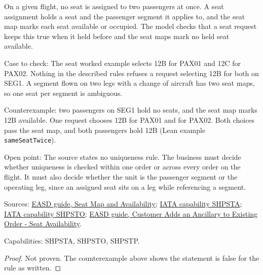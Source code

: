 \begin{theorem}
  \label{thm:ancillaries-seat-one-passenger}
  On a given flight, no seat is assigned to two passengers at once. A seat
  assignment holds a seat and the passenger segment it applies to, and the
  seat map marks each seat available or occupied.
  The model checks that a seat request keeps this true when it held before
  and the seat maps mark no held seat available.

  Case to check: The seat worked example selects 12B for PAX01 and 12C for
  PAX02. Nothing in the described rules refuses a request selecting 12B for
  both on SEG1. A segment flown on two legs with a change of aircraft has
  two seat maps, so one seat per segment is ambiguous.

  Counterexample: two passengers on SEG1 hold no seats, and the seat map
  marks 12B available.  One request chooses 12B for PAX01 and for PAX02.
  Both choices pass the seat map, and both passengers hold 12B (Lean
  example \texttt{sameSeatTwice}).

  Open point: The source states no uniqueness rule. The business must decide
  whether uniqueness is checked within one order or across every order on
  the flight. It must also decide whether the unit is the passenger segment
  or the operating leg, since an assigned seat sits on a leg while
  referencing a segment.

  Sources: \href{https://standards.atlassian.net/wiki/spaces/EASD/pages/574586953}{EASD guide, Seat Map and Availability};
  \href{https://retailing.iata.org/armi/docs/SHPSTA/}{IATA capability SHPSTA};
  \href{https://retailing.iata.org/armi/docs/SHPSTO/}{IATA capability SHPSTO};
  \href{https://standards.atlassian.net/wiki/spaces/EASD/pages/842268814}{EASD guide, Customer Adds an Ancillary to Existing Order - Seat Availability}.

  Capabilities: SHPSTA, SHPSTO, SHPSTP.
\end{theorem}
\begin{proof}
  Not proven.  The counterexample above shows the statement is false for the
  rule as written.
\end{proof}

